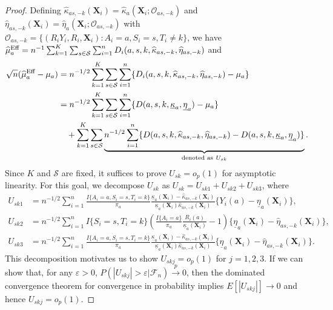 \documentclass[12pt]{article}
\newcommand{\bX}{\boldsymbol{X}}
\begin{document}
\begin{proof}
    Defining $\widehat{\kappa}_{as,-k}(\bX_i) = \widehat{\kappa}_a(\bX_i; \mathcal{O}_{as,-k})$ and $\widehat{\eta}_{as,-k}(\bX_i) = \widehat{\eta}_a(\bX_i; \mathcal{O}_{as,-k})$ with $ \mathcal{O}_{as,-k} = \{(R_iY_i, R_i, \bX_i): A_i = a, S_i=s, T_i\ne k\}$, we have $\widehat{\mu}_a^{\textup{Eff}} = n^{-1}\sum_{k=1}^K \sum_{s \in \mathcal{S}}\sum_{i=1}^n D_i(a, s,k,\widehat{\kappa}_{as,-k},\widehat{\eta}_{as,-k})$ and
    \begin{align*}
        \sqrt{n}(\widehat{\mu}_a^{\textup{Eff}} - \mu_a) &= n^{-1/2} \sum_{k=1}^K \sum_{s \in \mathcal{S}}\sum_{i=1}^n \{D_i(a, s,k,\widehat{\kappa}_{as,-k},\widehat{\eta}_{as,-k}) - \mu_a\} \\
        &= n^{-1/2} \sum_{k=1}^K \sum_{s \in \mathcal{S}}\sum_{i=1}^n \{D(a, s,k,\underline{\kappa}_a,\underline{\eta}_a) - \mu_a\} \\
        &\quad +\sum_{k=1}^K \sum_{s \in \mathcal{S}} \underbrace{n^{-1/2} \sum_{i=1}^n \{D(a, s,k,\widehat{\kappa}_{as,-k},\widehat{\eta}_{as,-k})-D(a, s,k,\underline{\kappa}_a,\underline{\eta}_a)\}}_{\textup{denoted as}\ U_{sk}}.
    \end{align*}
    Since $K$ and $\mathcal{S}$ are fixed, it suffices to prove $U_{sk}=o_p(1)$ for asymptotic linearity. For this goal, we decompose $U_{sk}$ as $U_{sk} = U_{sk1} + U_{sk2} + U_{sk3}$, where
    \begin{align*}
    U_{sk1} &= n^{-1/2} \sum_{i=1}^n \frac{I\{A_i=a,S_i=s, T_i=k\}}{\pi_a} \frac{\underline{\kappa}_{a}(\bX_i) - \widehat{\kappa}_{as,-k}(\bX_i)}{\underline{\kappa}_{a}(\bX_i)\widehat{\kappa}_{as,-k}(\bX_i)}\{Y_i(a) - \underline{\eta}_{a}(\bX_i)\},\\
    U_{sk2} &= n^{-1/2} \sum_{i=1}^n I\{S_i=s, T_i=k\}\left(\frac{I\{A_i=a\}}{\pi_a} \frac{R_i(a)}{\underline{\kappa}_{a}(\bX_i)}-1\right)  \{\underline{\eta}_{a}(\bX_i)-\widehat{\eta}_{as,-k}(\bX_i)\},\\
    U_{sk3} &= n^{-1/2} \sum_{i=1}^n \frac{I\{A_i=a,S_i=s, T_i=k\}}{\pi_a} \frac{\underline{\kappa}_a(\bX_i) - \widehat{\kappa} _{as,-k}(\bX_i)}{\underline{\kappa}_a(\bX_i)\widehat{\kappa} _{as,-k}(\bX_i)}\{\underline{\eta}_{a}(\bX_i)-\widehat{\eta}_{as,-k}(\bX_i)\}.
\end{align*}
This decomposition motivates us to show $U_{skj} = o_p(1)$ for $j=1,2,3$. If we can show that, for any $\varepsilon>0$, $P(|U_{skj}|>\varepsilon|\mathcal{F}_n) \xrightarrow{p} 0$, then the dominated convergence theorem for convergence in probability \citep[Theorem 1.5.3]{durrett2019probability} implies $E[|U_{skj}|]\rightarrow 0$ and hence $U_{skj} = o_p(1)$.


\end{proof}
\end{document}
